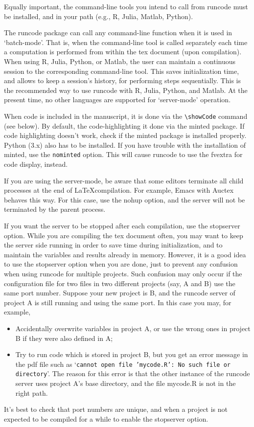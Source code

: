 \documentclass[a4paper,10pt]{article}
\begin{document}
Equally important, the command-line tools you intend to call from runcode must be installed, and in your path (e.g., R, Julia, Matlab, Python).

The runcode package can call any command-line function when it is used in `batch-mode'. That is, when the command-line tool is called separately each time a computation is performed from within the tex document (upon compilation). When using R, Julia, Python, or Matlab, the user can maintain a continuous session to the corresponding command-line tool. This saves initialization time, and allows to keep a session's history, for performing steps sequentially. This is the recommended way to use runcode with R, Julia, Python, and Matlab.
At the present time, no other languages are supported for `server-mode' operation.

When code is included in the manuscript, it is done via the \verb|\showCode| command (see below). By default, the code-highlighting it done via the minted package. If code highlighting doesn't work, check if the minted package is installed properly. Python (3.x) also has to be installed. If you have trouble with the installation of minted, use the \verb|nominted| option. This will cause runcode to use the fvextra for code display, instead.

If you are using the server-mode, be aware that some editors terminate all child processes at the end of \LaTeX compilation. For example, Emacs with Auctex behaves this way. For this case, use the nohup option, and the server will not be terminated by the parent process.

If you want the server to be stopped after each compilation, use the stopserver option. While you are compiling the tex document often, you may want to keep the server side running in order to save time during initialization, and to maintain the variables and results already in memory. However, it is a good idea to use the stopserver option when you are done, just to prevent any confusion when using runcode for multiple projects. Such confusion may only occur if the configuration file for two files in two different projects (say, A and B) use the same port number. Suppose your new project is B, and the runcode server of project A is still running and using the same port. In this case you may, for example,
\begin{itemize}
\item Accidentally overwrite variables in project A, or use the wrong ones in project B if they were also defined in A;
\item Try to run code which is stored in project B, but you get an error message in the pdf file such as `\texttt{cannot open file 'mycode.R': No such file or directory}'.   The reason for this error is that the other instance of the runcode server uses project A's base directory, and the file mycode.R is not in the right path.
\end{itemize}
It's best to check that port numbers are unique, and when a project is not expected to be compiled for a while to enable the stopserver option. 
\end{document}

